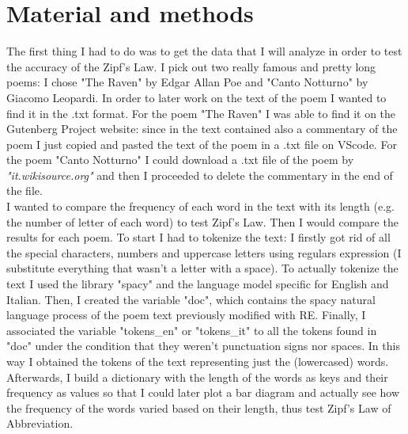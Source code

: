 \section{Material and methods}
The first thing I had to do was to get the data that I will analyze in order to test the accuracy of the Zipf's Law. 
I pick out two really famous and pretty long poems: I chose "The Raven" by Edgar Allan Poe and "Canto Notturno" by Giacomo Leopardi.
In order to later work on the text of the poem I wanted to find it in the .txt format. For the poem "The Raven" I was able to find it on the Gutenberg Project website: since in the text contained also a commentary of the poem I just copied and pasted the text of the poem in a .txt file on VScode. 
For the poem "Canto Notturno" I could download a .txt file of the poem by \textit{"it.wikisource.org"} and then I proceeded to delete the commentary in the end of the file.\\
I wanted to compare the frequency of each word in the text with its length (e.g. the number of letter of each word) to test Zipf's Law. Then I would compare the results for each poem.
To start I had to tokenize the text: I firstly got rid of all the special characters, numbers and uppercase letters using regulars expression (I substitute everything that wasn't a letter with a space). 
To actually tokenize the text I used the library "spacy" and the language model specific for English and Italian. 
Then, I created the variable "doc", which contains the spacy natural language process of the poem text previously modified with RE. 
Finally, I associated the variable "tokens\_en" or "tokens\_it" to all the tokens found in "doc" under the condition that they weren't punctuation signs nor spaces.
In this way I obtained the tokens of the text representing just the (lowercased) words.\\
Afterwards, I build a dictionary with the length of the words as keys and their frequency as values so that I could later plot a bar diagram and actually see how the frequency of the words varied based on their length, thus test Zipf's Law of Abbreviation. 

